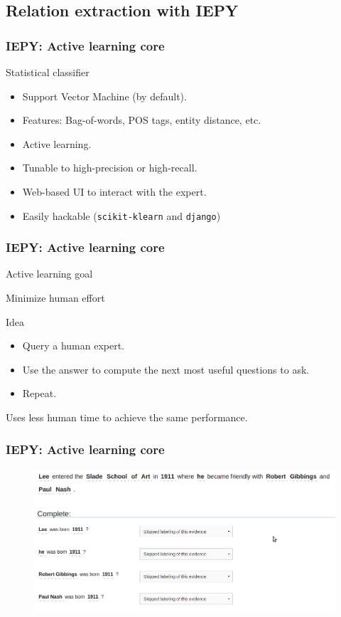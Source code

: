 \documentclass{beamer}
\begin{document}
\subsection{Relation extraction with IEPY}


\begin{frame}
\frametitle{IEPY: Active learning core}

\begin{block}{Statistical classifier}
\begin{itemize}
 \item Support Vector Machine (by default).
 \item Features: Bag-of-words, POS tags, entity distance, etc.
 \item Active learning.
 \item Tunable to high-precision or high-recall.
 \item Web-based UI to interact with the expert.
 \item Easily hackable ({\tt scikit-klearn} and {\tt django}) 
\end{itemize}
\end{block}
\end{frame}

\begin{frame}
\frametitle{IEPY: Active learning core}

\begin{block}{Active learning goal}
    \centerline{Minimize human effort}
\end{block}

\pause
\begin{block}{Idea}
\begin{itemize}
    \item Query a human expert.
    \item Use the answer to compute the next most useful questions to ask.
    \item Repeat.
\end{itemize}
\end{block}

Uses less human time to achieve the same performance.

\end{frame}

\begin{frame}
\frametitle{IEPY: Active learning core}

\begin{figure}
\includegraphics[width=1\linewidth]{al1}
\end{figure}

\end{frame}
\end{document}
